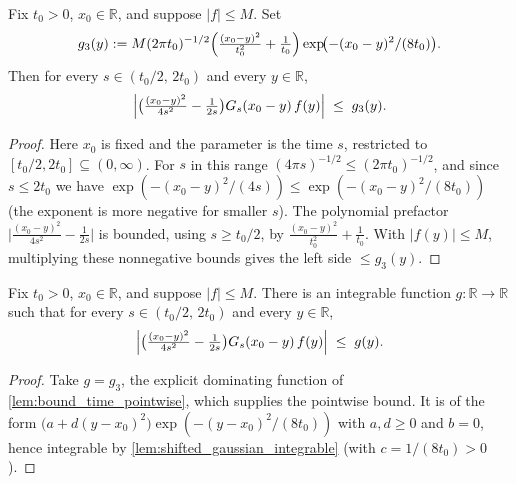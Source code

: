 \begin{lemma}
    \label{lem:bound_time_pointwise}
    \leanok
    Fix $t_0 > 0$, $x_0 \in \mathbb{R}$, and suppose $\lvert f\rvert \le M$. Set
    \[ g_3(y) := M(2\pi t_0)^{-1/2}\Bigl(\tfrac{(x_0-y)^2}{t_0^2} + \tfrac{1}{t_0}\Bigr)
        \exp\!\bigl(-(x_0-y)^2/(8t_0)\bigr). \]
    Then for every $s \in (t_0/2,\, 2t_0)$ and every $y \in \mathbb{R}$,
    \[ \Bigl\lvert \bigl(\tfrac{(x_0-y)^2}{4s^2} - \tfrac{1}{2s}\bigr)
        G_s(x_0-y)\, f(y)\Bigr\rvert \;\le\; g_3(y). \]
\end{lemma}
\begin{proof}
    Here $x_0$ is fixed and the parameter is the time $s$, restricted to
    $[t_0/2, 2t_0] \subseteq (0,\infty)$. For $s$ in this range
    $(4\pi s)^{-1/2} \le (2\pi t_0)^{-1/2}$, and since $s \le 2t_0$ we have
    $\exp(-(x_0-y)^2/(4s)) \le \exp(-(x_0-y)^2/(8t_0))$ (the exponent is more
    negative for smaller $s$). The polynomial prefactor
    $\bigl\lvert\tfrac{(x_0-y)^2}{4s^2} - \tfrac{1}{2s}\bigr\rvert$ is bounded, using
    $s \ge t_0/2$, by $\tfrac{(x_0-y)^2}{t_0^2} + \tfrac{1}{t_0}$. With
    $\lvert f(y)\rvert \le M$, multiplying these nonnegative bounds gives the left side
    $\le g_3(y)$.
\end{proof}

\begin{lemma}
    \label{lem:bound_time}
    \leanok
    Fix $t_0 > 0$, $x_0 \in \mathbb{R}$, and suppose $\lvert f\rvert \le M$. There is an
    integrable function $g : \mathbb{R} \to \mathbb{R}$ such that for every
    $s \in (t_0/2,\, 2t_0)$ and every $y \in \mathbb{R}$,
    \[ \Bigl\lvert \bigl(\tfrac{(x_0-y)^2}{4s^2} - \tfrac{1}{2s}\bigr)
        G_s(x_0-y)\, f(y)\Bigr\rvert \;\le\; g(y). \]
\end{lemma}
\begin{proof}
    Take $g = g_3$, the explicit dominating function of
    \cref{lem:bound_time_pointwise}, which supplies the pointwise bound. It is of the
    form $\bigl(a + d(y-x_0)^2\bigr)\exp(-(y-x_0)^2/(8t_0))$ with $a,d \ge 0$ and
    $b = 0$, hence integrable by \cref{lem:shifted_gaussian_integrable} (with
    $c = 1/(8t_0) > 0$).
\end{proof}

